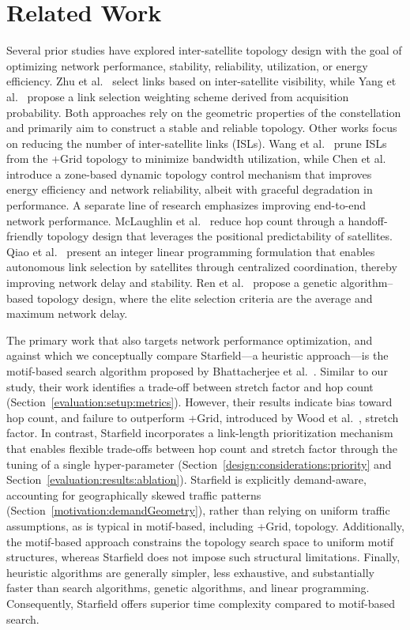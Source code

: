 \documentclass[acmsmall, screen]{acmart}
\begin{document}
\section{Related Work}\label{relatedWork}
Several prior studies have explored inter-satellite topology design with the goal of optimizing network performance, stability, reliability, utilization, or energy efficiency. Zhu et al.~\cite{zhu2022laser} select links based on inter-satellite visibility, while Yang et al.~\cite{yang2024analysis} propose a link selection weighting scheme derived from acquisition probability. Both approaches rely on the geometric properties of the constellation and primarily aim to construct a stable and reliable topology. Other works focus on reducing the number of inter-satellite links (ISLs). Wang et al.~\cite{wang2022intersatellite} prune ISLs from the +Grid topology to minimize bandwidth utilization, while Chen et al.~\cite{chen2025demand} introduce a zone-based dynamic topology control mechanism that improves energy efficiency and network reliability, albeit with graceful degradation in performance. A separate line of research emphasizes improving end-to-end network performance. McLaughlin et al.~\cite{mclaughlin2023grid} reduce hop count through a handoff-friendly topology design that leverages the positional predictability of satellites. Qiao et al.~\cite{qiao2023onboard} present an integer linear programming formulation that enables autonomous link selection by satellites through centralized coordination, thereby improving network delay and stability. Ren et al.~\cite{ren2025inter} propose a genetic algorithm–based topology design, where the elite selection criteria are the average and maximum network delay.

The primary work that also targets network performance optimization, and against which we conceptually compare Starfield—a heuristic approach—is the motif-based search algorithm proposed by Bhattacherjee et al.~\cite{bhattacherjee2019network}. Similar to our study, their work identifies a trade-off between stretch factor and hop count (Section~\ref{evaluation:setup:metrics}). However, their results indicate bias toward hop count, and failure to outperform +Grid, introduced by Wood et al.~\cite{wood2001internetworking}, stretch factor. In contrast, Starfield incorporates a link-length prioritization mechanism that enables flexible trade-offs between hop count and stretch factor through the tuning of a single hyper-parameter (Section~\ref{design:considerations:priority} and Section~\ref{evaluation:results:ablation}). Starfield is explicitly demand-aware, accounting for geographically skewed traffic patterns (Section~\ref{motivation:demandGeometry}), rather than relying on uniform traffic assumptions, as is typical in motif-based, including +Grid, topology. Additionally, the motif-based approach constrains the topology search space to uniform motif structures, whereas Starfield does not impose such structural limitations. Finally, heuristic algorithms are generally simpler, less exhaustive, and substantially faster than search algorithms, genetic algorithms, and linear programming. Consequently, Starfield offers superior time complexity compared to motif-based search.
\end{document}
